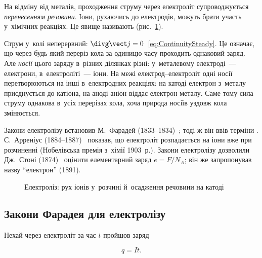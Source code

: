 На відміну від металів, проходження струму через електроліт супроводжується
\emph{перенесенням речовини}. Іони, рухаючись до електродів, можуть брати участь
у~хімічних реакціях. Це явище називають 
(рис.~\ref{pic:ElectrolysisCell}).

Струм у~колі неперервний: $\divg\vect j=0$~\eqref{eq:ContinuitySteady}. Це означає, що
через будь-який переріз кола за одиницю часу проходить однаковий заряд. Але \emph{носії}
цього заряду в~різних ділянках різні: у~металевому електроді~--- електрони,
в~електроліті~--- іони. На межі електрод--електроліт одні носії перетворюються на інші
в~електродних реакціях: на катоді електрон з~металу приєднується до катіона, на аноді
аніон віддає електрон металу. Саме тому сила струму однакова в~усіх перерізах кола, хоча
природа носіїв уздовж кола змінюється.

\begin{Historical}
	Закони електролізу встановив М.~Фарадей (1833--1834)~\cite{Faraday1834}; тоді ж він ввів терміни
	. С.~Арреніус (1884--1887)~\cite{Arrhenius1887} показав, що
	електроліт розпадається на іони вже при розчиненні (Нобелівська премія з~хімії
	1903~р.). Закони електролізу дозволили Дж.~Стоні (1874)~\cite{Stoney1881} оцінити елементарний заряд
	$e=F/N_A$; він же запропонував назву \enquote{електрон} (1891).
\end{Historical}

\begin{figure}[h!]\centering
	\caption{Електроліз: рух іонів у~розчині й~осадження речовини на
	катоді\label{pic:ElectrolysisCell}}
\end{figure}


\subsection*{Закони Фарадея для електролізу}


Нехай через електроліт за час $t$ пройшов заряд

\begin{equation*}
	q=It.
\end{equation*}

